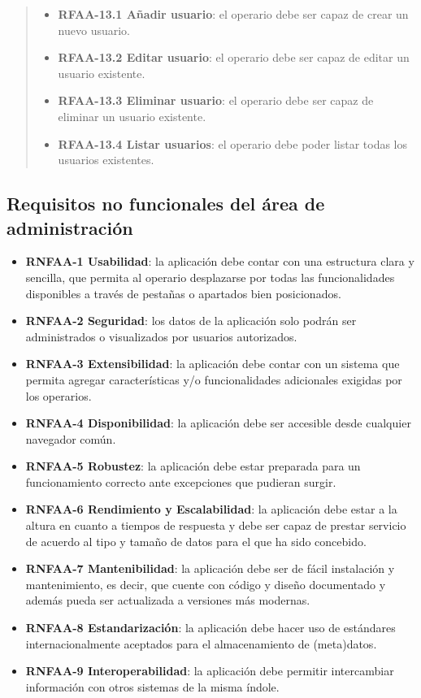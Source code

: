 \begin{itemize}
  \begin{quote}
  \begin{itemize}
  \tightlist
  \item
    \textbf{RFAA-13.1 Añadir usuario}: el operario debe ser capaz de
    crear un nuevo usuario.
  \item
    \textbf{RFAA-13.2 Editar usuario}: el operario debe ser capaz de
    editar un usuario existente.
  \item
    \textbf{RFAA-13.3 Eliminar usuario}: el operario debe ser capaz de
    eliminar un usuario existente.
  \item
    \textbf{RFAA-13.4 Listar usuarios}: el operario debe poder listar
    todas los usuarios existentes.
  \end{itemize}
  \end{quote}
\end{itemize}

\subsection{Requisitos no funcionales del área de administración}

\begin{itemize}
\tightlist
\item
  \textbf{RNFAA-1 Usabilidad}: la aplicación debe contar con una
  estructura clara y sencilla, que permita al operario desplazarse por
  todas las funcionalidades disponibles a través de pestañas o apartados
  bien posicionados.
\item
  \textbf{RNFAA-2 Seguridad}: los datos de la aplicación solo podrán ser
  administrados o visualizados por usuarios autorizados.
\item
  \textbf{RNFAA-3 Extensibilidad}: la aplicación debe contar con un
  sistema que permita agregar características y/o funcionalidades
  adicionales exigidas por los operarios.
\item
  \textbf{RNFAA-4 Disponibilidad}: la aplicación debe ser accesible
  desde cualquier navegador común.
\item
  \textbf{RNFAA-5 Robustez}: la aplicación debe estar preparada para un
  funcionamiento correcto ante excepciones que pudieran surgir.
\item
  \textbf{RNFAA-6 Rendimiento y Escalabilidad}: la aplicación debe estar
  a la altura en cuanto a tiempos de respuesta y debe ser capaz de
  prestar servicio de acuerdo al tipo y tamaño de datos para el que ha
  sido concebido.
\item
  \textbf{RNFAA-7 Mantenibilidad}: la aplicación debe ser de fácil
  instalación y mantenimiento, es decir, que cuente con código y diseño
  documentado y además pueda ser actualizada a versiones más modernas.
\item
  \textbf{RNFAA-8 Estandarización}: la aplicación debe hacer uso de
  estándares internacionalmente aceptados para el almacenamiento de
  (meta)datos.
\item
  \textbf{RNFAA-9 Interoperabilidad}: la aplicación debe permitir
  intercambiar información con otros sistemas de la misma índole.
\end{itemize}


